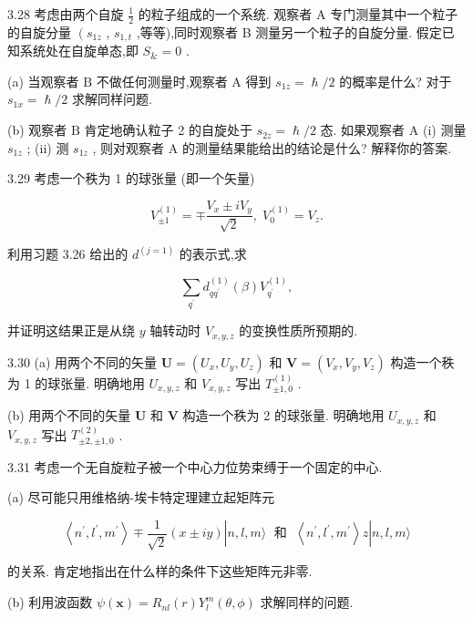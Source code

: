 3.28 考虑由两个自旋 $\frac{1}{2}$ 的粒子组成的一个系统. 观察者 $\mathrm{A}$ 专门测量其中一个粒子的自旋分量 $\left( {s}_{1z}\right.$ , ${s}_{1, t}$ ,等等),同时观察者 B 测量另一个粒子的自旋分量. 假定已知系统处在自旋单态,即 ${S}_{\& } = 0$ .

(a) 当观察者 $\mathrm{B}$ 不做任何测量时,观察者 $\mathrm{A}$ 得到 ${s}_{1z} = \hslash /2$ 的概率是什么? 对于 ${s}_{1x} = \hslash /2$ 求解同样问题.

(b) 观察者 $\mathrm{B}$ 肯定地确认粒子 2 的自旋处于 ${s}_{2z} = \hslash /2$ 态. 如果观察者 $\mathrm{A}$ (i) 测量 ${s}_{1z}$ ; (ii) 测 ${s}_{1z}$ , 则对观察者 $\mathrm{A}$ 的测量结果能给出的结论是什么? 解释你的答案.

3.29 考虑一个秩为 1 的球张量 (即一个矢量)

$$
{V}_{\pm 1}^{\left( 1\right) } = \mp \frac{{V}_{x} \pm i{V}_{y}}{\sqrt{2}},\;{V}_{0}^{\left( 1\right) } = {V}_{z}.
$$

利用习题 3.26 给出的 ${d}^{\left( j = 1\right) }$ 的表示式,求

$$
\mathop{\sum }\limits_{{q}^{\prime }}{d}_{q{q}^{\prime }}^{\left( 1\right) }\left( \beta \right) {V}_{{q}^{\prime }}^{\left( 1\right) },
$$

并证明这结果正是从绕 $y$ 轴转动时 ${V}_{x, y, z}$ 的变换性质所预期的.

3.30 (a) 用两个不同的矢量 $\mathbf{U} = \left( {{U}_{x},{U}_{y},{U}_{z}}\right)$ 和 $\mathbf{V} = \left( {{V}_{x},{V}_{y},{V}_{z}}\right)$ 构造一个秩为 1 的球张量. 明确地用 ${U}_{x, y, z}$ 和 ${V}_{x, y, z}$ 写出 ${T}_{\pm 1,0}^{\left( 1\right) }$ .

(b) 用两个不同的矢量 $\mathbf{U}$ 和 $\mathbf{V}$ 构造一个秩为 2 的球张量. 明确地用 ${U}_{x, y, z}$ 和 ${V}_{x, y, z}$ 写出 ${T}_{\pm 2, \pm 1,0}^{\left( 2\right) }$ .

3.31 考虑一个无自旋粒子被一个中心力位势束缚于一个固定的中心.

(a) 尽可能只用维格纳-埃卡特定理建立起矩阵元

$$
\left\langle {{n}^{\prime },{l}^{\prime },{m}^{\prime }}\right\rangle \mp \frac{1}{\sqrt{2}}\left( {x \pm {iy}}\right) \left| {n, l, m\rangle \;\text{ 和 }\;\left\langle {{n}^{\prime },{l}^{\prime },{m}^{\prime }}\right\rangle z}\right| n, l, m\rangle
$$

的关系. 肯定地指出在什么样的条件下这些矩阵元非零.

(b) 利用波函数 $\psi \left( \mathbf{x}\right) = {R}_{nl}\left( r\right) {Y}_{l}^{m}\left( {\theta ,\phi }\right)$ 求解同样的问题.

